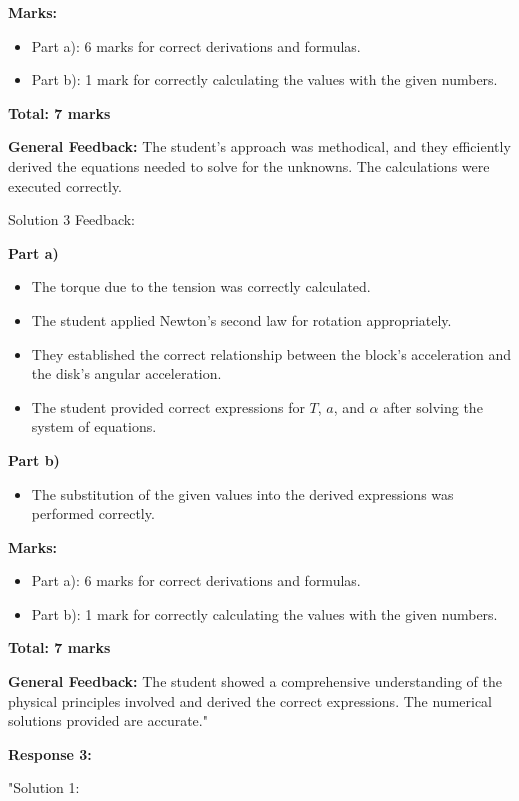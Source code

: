 \documentclass[a4paper,11pt]{article}
\begin{document}
\textbf{Marks:}
\begin{itemize}
    \item Part a): 6 marks for correct derivations and formulas.
    \item Part b): 1 mark for correctly calculating the values with the given numbers.
\end{itemize}

\textbf{Total: 7 marks}

\textbf{General Feedback:} The student's approach was methodical, and they efficiently derived the equations needed to solve for the unknowns. The calculations were executed correctly.

Solution 3 Feedback:

\textbf{Part a)}
\begin{itemize}
    \item The torque due to the tension was correctly calculated.
    \item The student applied Newton's second law for rotation appropriately.
    \item They established the correct relationship between the block's acceleration and the disk's angular acceleration.
    \item The student provided correct expressions for \( T \), \( a \), and \( \alpha \) after solving the system of equations.
\end{itemize}

\textbf{Part b)}
\begin{itemize}
    \item The substitution of the given values into the derived expressions was performed correctly.
\end{itemize}

\textbf{Marks:}
\begin{itemize}
    \item Part a): 6 marks for correct derivations and formulas.
    \item Part b): 1 mark for correctly calculating the values with the given numbers.
\end{itemize}

\textbf{Total: 7 marks}

\textbf{General Feedback:} The student showed a comprehensive understanding of the physical principles involved and derived the correct expressions. The numerical solutions provided are accurate."

\textbf{Response 3:}

"Solution 1:
\end{document}
